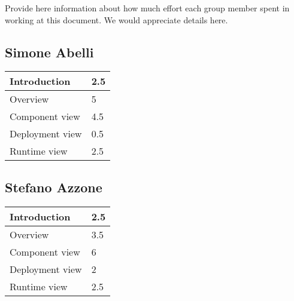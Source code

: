 Provide here information about how much effort each group member spent in working at this document. We would appreciate details here.\\

\subsection{Simone Abelli}
\begin{tabular} { | m{5cm} | m{1cm} | }
	\hline
	Introduction & 2.5\\
	\hline
	Overview & 5\\
	\hline
	Component view & 4.5\\
	\hline
	Deployment view & 0.5\\
	\hline
	Runtime view & 2.5\\
	\hline
\end{tabular}

\subsection{Stefano Azzone}
\begin{tabular} { | m{5cm} | m{1cm} | }
	\hline
	Introduction & 2.5\\
	\hline
	Overview & 3.5\\
	\hline
	Component view & 6\\
	\hline
	Deployment view & 2\\
	\hline
	Runtime view & 2.5\\
	\hline
\end{tabular}